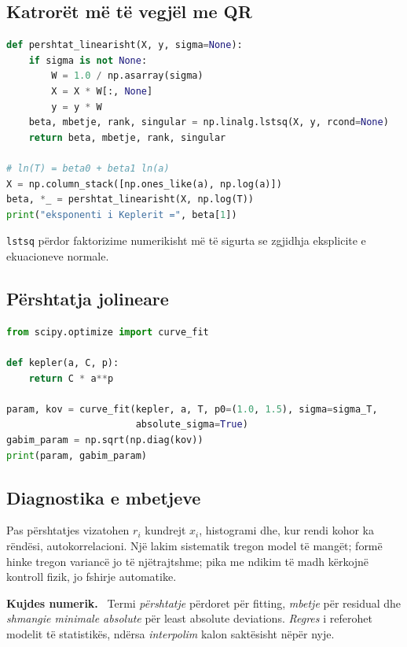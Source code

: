\documentclass[11pt,oneside,openany]{book}
\newenvironment{kujdes}{\par\medskip\noindent\textbf{Kujdes numerik.}\ }{\par\medskip}
\begin{document}
\subsection{Katrorët më të vegjël me QR}
\begin{lstlisting}[language=Python,caption={Përshtatja e një modeli linear në parametra.}]
def pershtat_linearisht(X, y, sigma=None):
    if sigma is not None:
        W = 1.0 / np.asarray(sigma)
        X = X * W[:, None]
        y = y * W
    beta, mbetje, rank, singular = np.linalg.lstsq(X, y, rcond=None)
    return beta, mbetje, rank, singular

# ln(T) = beta0 + beta1 ln(a)
X = np.column_stack([np.ones_like(a), np.log(a)])
beta, *_ = pershtat_linearisht(X, np.log(T))
print("eksponenti i Keplerit =", beta[1])
\end{lstlisting}
\texttt{lstsq} përdor faktorizime numerikisht më të sigurta se zgjidhja eksplicite e ekuacioneve normale.

\subsection{Përshtatja jolineare}
\begin{lstlisting}[language=Python,caption={Përshtatja e modelit $T=C a^p$ në shkallën origjinale.}]
from scipy.optimize import curve_fit

def kepler(a, C, p):
    return C * a**p

param, kov = curve_fit(kepler, a, T, p0=(1.0, 1.5), sigma=sigma_T,
                       absolute_sigma=True)
gabim_param = np.sqrt(np.diag(kov))
print(param, gabim_param)
\end{lstlisting}

\subsection{Diagnostika e mbetjeve}
Pas përshtatjes vizatohen $r_i$ kundrejt $x_i$, histogrami dhe, kur rendi kohor ka rëndësi, autokorrelacioni. Një lakim sistematik tregon model të mangët; formë hinke tregon variancë jo të njëtrajtshme; pika me ndikim të madh kërkojnë kontroll fizik, jo fshirje automatike.

\begin{kujdes}
Termi \emph{përshtatje} përdoret për fitting, \emph{mbetje} për residual dhe \emph{shmangie minimale absolute} për least absolute deviations. \emph{Regres} i referohet modelit të statistikës, ndërsa \emph{interpolim} kalon saktësisht nëpër nyje.
\end{kujdes}
\end{document}
